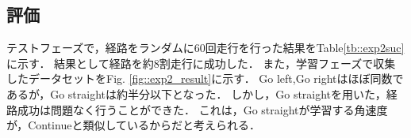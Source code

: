 \newpage
\subsection{評価}
テストフェーズで，経路をランダムに60回走行を行った結果をTable\ref{tb::exp2suc}に示す．
結果として経路を約8割走行に成功した．
また，学習フェーズで収集したデータセットをFig. \ref{fig::exp2_result}に示す．
Go left,Go rightはほぼ同数であるが，Go straightは約半分以下となった．
しかし，Go straightを用いた，経路成功は問題なく行うことができた．
これは，Go straightが学習する角速度が，Continueと類似しているからだと考えられる．


  
